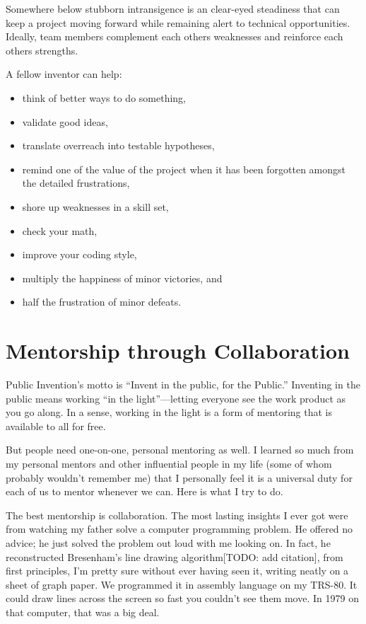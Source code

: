\documentclass[
	fontsize=10pt, %
	twoside=false, %
	secnumdepth=1, %
]{kaobook}
\begin{document}
Somewhere below stubborn intransigence is an
clear-eyed steadiness that can keep a project
moving forward while remaining alert to technical opportunities.
Ideally, team members complement each others weaknesses
and reinforce each others strengths.

A fellow inventor can help:
\begin{itemize}
\item think of better ways to do something,
\item validate good ideas,
\item translate overreach into testable hypotheses,
\item remind one of the value of the project when it has been forgotten amongst the detailed frustrations,
\item shore up weaknesses in a skill set,
\item check your math,
\item improve your coding style,
\item multiply the happiness of minor victories, and
  \item half the frustration of minor defeats.
  \end{itemize}

\section{Mentorship through Collaboration}

Public Invention’s motto is “Invent in the public, for the
Public.”  Inventing in the
public means working “in the light”---letting everyone see the work
product as you go along.  In a sense, working in the light is a form
of mentoring that is available to all for free.

But people need one-on-one, personal mentoring as well. I learned so
much from my personal mentors and other influential people in my life
(some of whom probably wouldn’t remember me) that I personally feel it
is a universal duty for each of us to mentor whenever we can.
Here is what I try to do.

The best mentorship is collaboration. The most lasting insights I ever
got were from watching my father solve a computer programming
problem. He offered no advice; he just solved the problem out loud
with me looking on. In fact, he reconstructed Bresenham’s line drawing
algorithm[TODO: add citation], from first
principles, I’m pretty sure without ever having seen it, writing neatly on a sheet of graph paper.
We programmed it in assembly language on my TRS-80. It could draw lines across the
screen so fast you couldn’t see them move. In 1979 on that computer,
that was a big deal.
\end{document}
